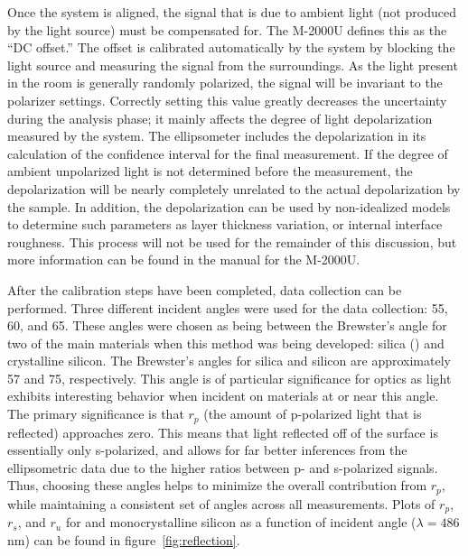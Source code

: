 Once the system is aligned, the signal that is due to ambient light (not produced by the light source) must be compensated for. The M-2000U defines this as the ``DC offset.''\cite{WVASE-manual} The offset is calibrated automatically by the system by blocking the light source and measuring the signal from the surroundings. As the light present in the room is generally randomly polarized, the signal will be invariant to the polarizer settings. Correctly setting this value greatly decreases the uncertainty during the analysis phase; it mainly affects the degree of light depolarization measured by the system. The ellipsometer includes the depolarization in its calculation of the confidence interval for the final measurement. If the degree of ambient unpolarized light is not determined before the measurement, the depolarization will be nearly completely unrelated to the actual depolarization by the sample. In addition, the depolarization can be used by non-idealized models to determine such parameters as layer thickness variation, or internal interface roughness. This process will not be used for the remainder of this discussion, but more information can be found in the manual for the M-2000U.\cite{WVASE-manual} 

After the calibration steps have been completed, data collection can be performed. Three different incident angles were used for the data collection: 55\Deg{}, 60\Deg{}, and 65\Deg{}. These angles were chosen as being between the Brewster's angle\cite{optik-brewster} for two of the main materials when this method was being developed: silica () and crystalline silicon. The Brewster's angles for silica and silicon are approximately 57\Deg{} and 75\Deg{}, respectively.\cite{refractive_index} This angle is of particular significance for optics as light exhibits interesting behavior when incident on materials at or near this angle. The primary significance is that $r_{p}$ (the amount of p-polarized light that is reflected) approaches zero. This means that light reflected off of the surface is essentially only s-polarized, and allows for far better inferences from the ellipsometric data due to the higher ratios between p- and s-polarized signals. Thus, choosing these angles helps to minimize the overall contribution from $r_{p}$, while maintaining a consistent set of angles across all measurements. Plots of $r_{p}$, $r_{s}$, and $r_{u}$ for  and monocrystalline silicon as a function of incident angle ($\lambda=486$ nm) can be found in figure~\vref{fig:reflection}.\cite{optik-brewster}


